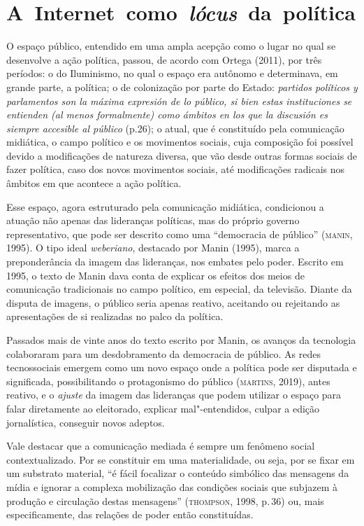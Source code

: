 \section{A~Internet~como~\textit{lócus}~da~política}

O espaço público, entendido em uma ampla acepção como o lugar no qual se
desenvolve a ação política, passou, de acordo com Ortega (2011), por
três períodos: o do Iluminismo, no qual o espaço era autônomo e
determinava, em grande parte, a política; o de colonização por parte do
Estado: \textit{partidos políticos y parlamentos son la máxima expresión de lo
público, si bien estas instituciones se entienden (al menos formalmente)
como ámbitos en los que la discusión es siempre accesible al público}
(p.26); o atual, que é constituído pela comunicação midiática, o campo
político e os movimentos sociais, cuja composição foi possível devido a
modificações de natureza diversa, que vão desde outras formas sociais de
fazer política, caso dos novos movimentos sociais, até modificações
radicais nos âmbitos em que acontece a ação política.

Esse espaço, agora estruturado pela comunicação midiática, condicionou a
atuação não apenas das lideranças políticas, mas do próprio governo
representativo, que pode ser descrito como uma ``democracia de público''
(\textsc{manin}, 1995). O tipo ideal \textit{weberiano}, destacado por Manin (1995), marca
a preponderância da imagem das lideranças, nos embates pelo poder.
Escrito em 1995, o texto de Manin dava conta de explicar os efeitos dos
meios de comunicação tradicionais no campo político, em especial, da
televisão. Diante da disputa de imagens, o público seria apenas reativo,
aceitando ou rejeitando as apresentações de si realizadas no palco da
política.

Passados mais de vinte anos do texto escrito por Manin, os avanços da
tecnologia colaboraram para um desdobramento da democracia de público.
As redes tecnossociais emergem como um novo espaço onde a política pode
ser disputada e significada, possibilitando o protagonismo do público
(\textsc{martins}, 2019), antes reativo, e o \textit{ajuste} da imagem das lideranças
que podem utilizar o espaço para falar diretamente ao eleitorado,
explicar mal"-entendidos, culpar a edição jornalística, conseguir novos
adeptos.

Vale destacar que a comunicação mediada é sempre um fenômeno social
contextualizado. Por se constituir em uma materialidade, ou seja, por se
fixar em um substrato material, ``é fácil focalizar o conteúdo simbólico
das mensagens da mídia e ignorar a complexa mobilização das condições
sociais que subjazem à produção e circulação destas mensagens''
(\textsc{thompson}, 1998, p.\,36) ou, mais especificamente, das relações de poder
então constituídas.

